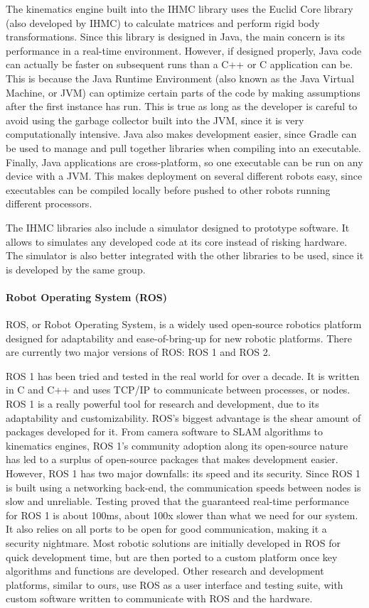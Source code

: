 The kinematics engine built into the IHMC library uses the Euclid Core library (also developed by IHMC) to calculate matrices and perform rigid body transformations. Since this library is designed in Java, the main concern is its performance in a real-time environment. However, if designed properly, Java code can actually be faster on subsequent runs than a C++ or C application can be. This is because the Java Runtime Environment (also known as the Java Virtual Machine, or JVM) can optimize certain parts of the code by making assumptions after the first instance has run. This is true as long as the developer is careful to avoid using the garbage collector built into the JVM, since it is very computationally intensive. Java also makes development easier, since Gradle can be used to manage and pull together libraries when compiling into an executable. Finally, Java applications are cross-platform, so one executable can be run on any device with a JVM. This makes deployment on several different robots easy, since executables can be compiled locally before pushed to other robots running different processors.

The IHMC libraries also include a simulator designed to prototype software. It allows to simulates any developed code at its core instead of risking hardware. The simulator is also better integrated with the other libraries to be used, since it is developed by the same group.

\paragraph*{Robot Operating System (ROS)}
ROS, or Robot Operating System, is a widely used open-source robotics platform designed for adaptability and ease-of-bring-up for new robotic platforms. There are currently two major versions of ROS: ROS 1 and ROS 2.

ROS 1 has been tried and tested in the real world for over a decade. It is written in C and C++ and uses TCP/IP to communicate between processes, or nodes. ROS 1 is a really powerful tool for research and development, due to its adaptability and customizability. ROS's biggest advantage is the shear amount of packages developed for it. From camera software to SLAM algorithms to kinematics engines, ROS 1's community adoption along its open-source nature has led to a surplus of open-source packages that makes development easier. However, ROS 1 has two major downfalls: its speed and its security. Since ROS 1 is built using a networking back-end, the communication speeds between nodes is slow and unreliable. Testing proved that the guaranteed real-time performance for ROS 1 is about 100ms, about 100x slower than what we need for our system. It also relies on all ports to be open for good communication, making it a security nightmare. Most robotic solutions are initially developed in ROS for quick development time, but are then ported to a custom platform once key algorithms and functions are developed. Other research and development platforms, similar to ours, use ROS as a user interface and testing suite, with custom software written to communicate with ROS and the hardware.

